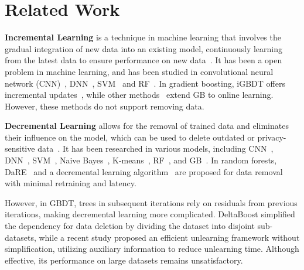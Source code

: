 \section{Related Work}
\vspace{-.02in}
\textbf{Incremental Learning} is a technique in machine learning that involves the gradual integration of new data into an existing model, continuously learning from the latest data to ensure performance on new data~\cite{DBLP:journals/natmi/VenTT22}. It has been a open problem in machine learning, and has been studied in convolutional neural network (CNN)~\cite{DBLP:journals/tsmc/PolikarUUH01, DBLP:conf/cvpr/KuzborskijOC13, DBLP:conf/cvpr/0001WYMPZ22}, DNN~\cite{DBLP:journals/ieeemm/HussainLT23, dekhovich2023continual}, SVM~\cite{DBLP:journals/cluster/ChenXXZ19, DBLP:conf/nips/CauwenberghsP00} and RF~\cite{DBLP:conf/icip/WangWCL09, DBLP:journals/corr/abs-2009-05567}. In gradient boosting, iGBDT offers incremental updates~\cite{DBLP:journals/npl/ZhangZSAFS19}, while other methods~\cite{DBLP:conf/nips/BeygelzimerHKL15, DBLP:conf/iccvw/Babenko0B09} extend GB to online learning. However, these methods do not support removing data.


\textbf{Decremental Learning} allows for the removal of trained data and eliminates their influence on the model, which can be used to delete outdated or privacy-sensitive data~\cite{DBLP:conf/sp/BourtouleCCJTZL21, DBLP:journals/corr/abs-2209-02299, DBLP:conf/nips/SekhariAKS21, DBLP:journals/csur/XuZZZY24}. It has been researched in various models, including CNN~\cite{DBLP:journals/corr/abs-2304-02049, DBLP:journals/corr/abs-2111-08947}, DNN~\cite{chen2023boundary, DBLP:conf/uss/ThudiJSP22}, SVM~\cite{DBLP:conf/nips/KarasuyamaT09, DBLP:conf/nips/CauwenberghsP00}, Naive Bayes~\cite{DBLP:conf/sp/CaoY15}, K-means~\cite{DBLP:conf/nips/GinartGVZ19}, RF~\cite{DBLP:conf/sigmod/SchelterGD21, DBLP:conf/icml/BrophyL21}, and GB~\cite{DBLP:journals/pacmmod/WuZLH23, DBLP:journals/corr/abs-2311-13174}. In random forests, DaRE~\cite{DBLP:conf/icml/BrophyL21} and a decremental learning algorithm~\cite{DBLP:conf/sigmod/SchelterGD21} are proposed for data removal with minimal retraining and latency.

However, in GBDT, trees in subsequent iterations rely on residuals from previous iterations, making decremental learning more complicated. DeltaBoost \citet{DBLP:journals/pacmmod/WuZLH23} simplified the dependency for data deletion by dividing the dataset into disjoint sub-datasets, while a recent study \citet{DBLP:conf/kdd/LinCL023} proposed an efficient unlearning framework without simplification, utilizing auxiliary information to reduce unlearning time. Although effective, its performance on large datasets remains unsatisfactory.



\vspace{-.08in}